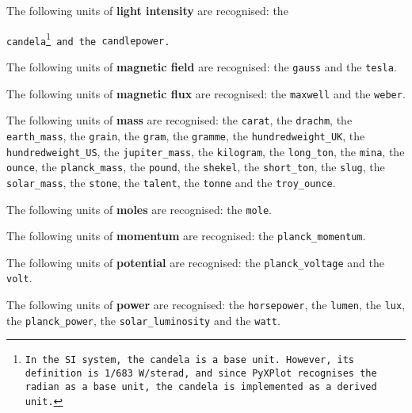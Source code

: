 \noindent The following units of {\bf light intensity} are recognised:\newline
\noindent the {\tt candela\footnote{In the SI system, the candela is a base unit. However, its definition is 1/683\,W/sterad, and since PyXPlot recognises the radian as a base unit, the candela is implemented as a derived unit.} and the {\tt candlepower}.\vspace{5mm}

\noindent The following units of {\bf magnetic field} are recognised:\newline
\noindent the {\tt gauss} and the {\tt tesla}.\vspace{5mm}

\noindent The following units of {\bf magnetic flux} are recognised:\newline
\noindent the {\tt maxwell} and the {\tt weber}.\vspace{5mm}

\noindent The following units of {\bf mass} are recognised:\newline
\noindent the {\tt carat}, the {\tt drachm}, the {\tt earth\_\-mass}, the {\tt grain}, the {\tt gram}, the {\tt gramme}, the {\tt hundredweight\_\-UK}, the {\tt hundredweight\_\-US}, the {\tt jupiter\_\-mass}, the {\tt kilogram}, the {\tt long\_\-ton}, the {\tt mina}, the {\tt ounce}, the {\tt planck\_\-mass}, the {\tt pound}, the {\tt shekel}, the {\tt short\_\-ton}, the {\tt slug}, the {\tt solar\_\-mass}, the {\tt stone}, the {\tt talent}, the {\tt tonne} and the {\tt troy\_\-ounce}.\vspace{5mm}

\noindent The following units of {\bf moles} are recognised:\newline
\noindent the {\tt mole}.\vspace{5mm}

\noindent The following units of {\bf momentum} are recognised:\newline
\noindent the {\tt planck\_\-momentum}.\vspace{5mm}

\noindent The following units of {\bf potential} are recognised:\newline
\noindent the {\tt planck\_\-voltage} and the {\tt volt}.\vspace{5mm}

\noindent The following units of {\bf power} are recognised:\newline
\noindent the {\tt horsepower}, the {\tt lumen}, the {\tt lux}, the {\tt planck\_\-power}, the {\tt solar\_\-luminosity} and the {\tt watt}.\vspace{5mm}

}
